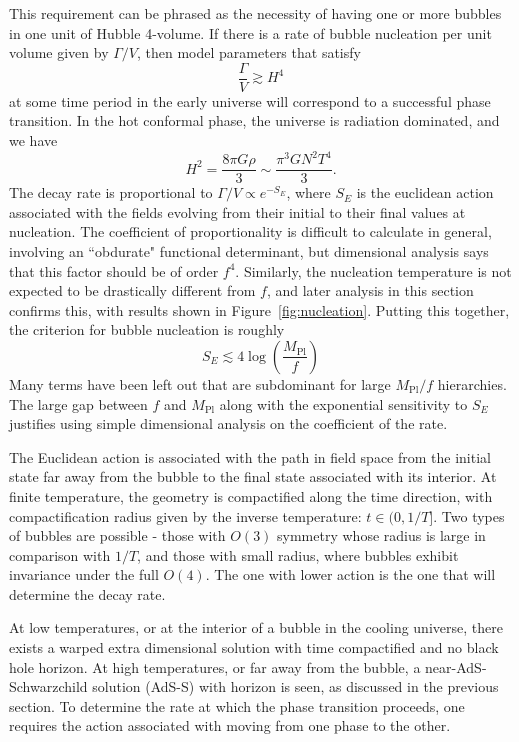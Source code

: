 \documentclass[12pt]{article}
\begin{document}
This requirement can be phrased as the necessity of having one or more bubbles in one unit of Hubble 4-volume.  If there is a rate of bubble nucleation per unit volume given by $\Gamma/V$, then model parameters that satisfy
\begin{equation}
\frac{\Gamma}{V} \gtrsim H^4
\end{equation}
at some time period in the early universe will correspond to a successful phase transition.  In the hot conformal phase, the universe is radiation dominated, and we have 
\begin{equation}
H^2 =\frac{ 8 \pi G \rho }{3} \sim \frac{\pi^3 G N^2 T^4}{3}.
\end{equation}
The decay rate is proportional to $\Gamma/V \propto e^{-S_E}$, where $S_E$ is the euclidean action associated with the fields evolving from their initial to their final values at nucleation.  The coefficient of proportionality is difficult to calculate in general, involving an ``obdurate" functional determinant, but dimensional analysis says that this factor should be of order $f^4$.  Similarly, the nucleation temperature is not expected to be drastically different from $f$, and later analysis in this section confirms this, with results shown in Figure~\ref{fig:nucleation}.  Putting this together, the criterion for bubble nucleation is roughly
\begin{equation}
S_E \lesssim 4 \log \left( \frac{M_\text{Pl}}{f} \right)
\label{eq:Scrit}
\end{equation}
Many terms have been left out that are subdominant for large $M_\text{Pl}/f$ hierarchies.  The large gap between $f$ and $M_\text{Pl}$ along with the exponential sensitivity to $S_E$ justifies using simple dimensional analysis on the coefficient of the rate.

The Euclidean action is associated with the path in field space from the initial state far away from the bubble to the final state associated with its interior.  At finite temperature, the geometry is compactified along the time direction, with compactification radius given by the inverse temperature: $t \in ( 0, 1/T ]$.  Two types of bubbles are possible - those with $O(3)$ symmetry whose radius is large in comparison with $1/T$, and those with small radius, where bubbles exhibit invariance under the full $O(4)$.  The one with lower action is the one that will determine the decay rate.

At low temperatures, or at the interior of a bubble in the cooling universe, there exists a warped extra dimensional solution with time compactified and no black hole horizon.   At high temperatures, or far away from the bubble, a near-AdS-Schwarzchild solution (AdS-S) with horizon is seen, as discussed in the previous section.  To determine the rate at which the phase transition proceeds, one requires the action associated with moving from one phase to the other.
\end{document}
